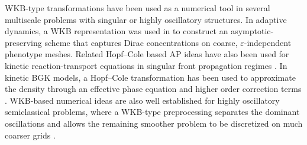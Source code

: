 \documentclass[11pt]{article}
\begin{document}
WKB-type transformations have been used as a numerical tool in several multiscale problems with singular or highly oscillatory structures. In adaptive dynamics, a WKB representation was used in \cite{AlmeidaPerthameRuan} to construct an asymptotic-preserving scheme that captures Dirac concentrations on coarse, \(\varepsilon\)-independent phenotype meshes. Related Hopf--Cole based AP ideas have also been used for kinetic reaction-transport equations in singular front propagation regimes \cite{Hivert2018}. In kinetic BGK models, a Hopf--Cole transformation has been used to approximate the density through an effective phase equation and higher order correction terms \cite{LuoPayne2017}. WKB-based numerical ideas are also well established for highly oscillatory semiclassical problems, where a WKB-type preprocessing separates the dominant oscillations and allows the remaining smoother problem to be discretized on much coarser grids \cite{ArnoldAbdallahNegulescu2011,KoernerArnoldDoepfner2022}.




\end{document}
